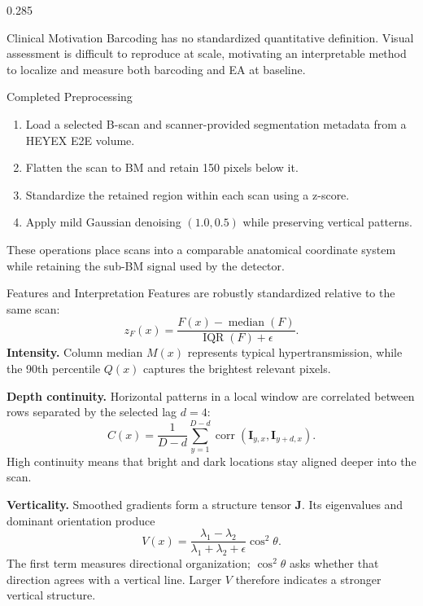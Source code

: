 \documentclass[final]{beamer}
\begin{document}
\begin{frame}[t]
\begin{columns}[t,totalwidth=\dimexpr\paperwidth-4cm\relax]
\begin{column}{0.285\textwidth}
\begin{block}{Clinical Motivation}
    \vspace{0.4cm}
    Barcoding has no standardized quantitative definition. Visual assessment
    is difficult to reproduce at scale, motivating an interpretable method to
    localize and measure both barcoding and EA at baseline.
  \end{block}

  \begin{block}{Completed Preprocessing}
    \begin{enumerate}
      \item Load a selected B-scan and scanner-provided segmentation metadata from a HEYEX E2E volume.
      \item Flatten the scan to BM and retain 150 pixels below it.
      \item Standardize the retained region within each scan using a z-score.
      \item Apply mild Gaussian denoising $(1.0,0.5)$ while preserving vertical patterns.
    \end{enumerate}
    These operations place scans into a comparable anatomical coordinate
    system while retaining the sub-BM signal used by the detector.
  \end{block}

  \begin{block}{Features and Interpretation}
    Features are robustly standardized relative to the same scan:
    \[
      z_F(x)=\frac{F(x)-\operatorname{median}(F)}
      {\operatorname{IQR}(F)+\epsilon}.
    \]
    \textbf{Intensity.} Column median $M(x)$ represents typical
    hypertransmission, while the 90th percentile $Q(x)$ captures the brightest
    relevant pixels.

    \textbf{Depth continuity.} Horizontal patterns in a local window are
    correlated between rows separated by the selected lag $d=4$:
    \[
      C(x)=\frac{1}{D-d}\sum_{y=1}^{D-d}
      \operatorname{corr}(\mathbf I_{y,x},\mathbf I_{y+d,x}).
    \]
    High continuity means that bright and dark locations stay aligned deeper
    into the scan.

    \textbf{Verticality.} Smoothed gradients form a structure tensor
    $\mathbf J$. Its eigenvalues and dominant orientation produce
    \[
      V(x)=\frac{\lambda_1-\lambda_2}
      {\lambda_1+\lambda_2+\epsilon}\cos^2\theta.
    \]
    The first term measures directional organization; $\cos^2\theta$ asks
    whether that direction agrees with a vertical line. Larger $V$ therefore
    indicates a stronger vertical structure.


\end{block}
\end{column}
\end{columns}
\end{frame}
\end{document}
